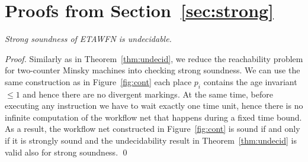 \section{Proofs from Section~\ref{sec:strong}} \label{app:undecid2}

{\em Strong soundness of ETAWFN is undecidable.}
\begin{proof}
Similarly as in Theorem~\ref{thm:undecid},
we reduce the reachability problem for
two-counter Minsky machines into checking strong soundness. We can use
the same construction as in Figure~\ref{fig:cont} each place
$p_i$ contains the age invariant $\leq 1$ and hence there are no divergent
markings. At the same time, before executing any instruction we have to
wait exactly one time unit, hence there is no infinite computation of the
workflow net that happens during a fixed time bound. As a result,
the workflow net constructed in Figure~\ref{fig:cont} is sound if and only
if it is strongly sound and the undecidability result in 
Theorem~\ref{thm:undecid} is valid also for strong soundness.
\qed
\end{proof}



